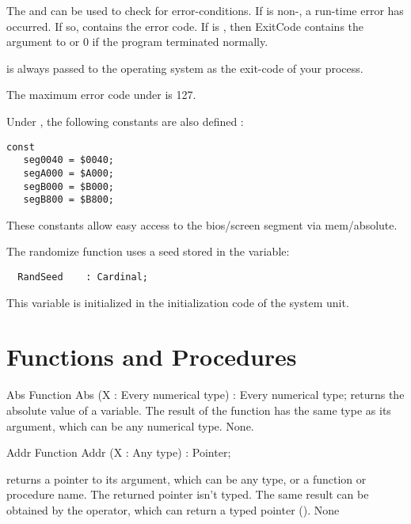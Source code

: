 \documentclass{report}
\begin{document}

The  and  can be used to check for
error-conditions. If  is non-, a run-time error has
occurred. If so,  contains the error code. If  is
, then {ExitCode} contains the argument to  or 0 if the
program terminated normally.

 is always passed to the operating system as the exit-code of
your process. 

\begin{remark}
The maximum error code under \linux is 127.
\end{remark}

Under , the following constants are also defined :
\begin{verbatim}
const
   seg0040 = $0040;
   segA000 = $A000;
   segB000 = $B000;
   segB800 = $B800;
\end{verbatim}
These constants allow easy access to the bios/screen segment via mem/absolute.

The randomize function uses a seed stored in the  variable:
\begin{verbatim}
  RandSeed    : Cardinal;
\end{verbatim}
This variable is initialized in the initialization code of the system unit.

\section{Functions and Procedures}

\begin{function}{Abs}
\Declaration
Function Abs (X : Every numerical type) : Every numerical type;
\Description
{} returns the absolute value of a variable. The result of the
function has the same type as its argument, which can be any numerical
type.
\Errors
None.
\SeeAlso
{}
\end{function}


\begin{function}{Addr}
\Declaration
Function Addr (X : Any type) : Pointer;

\Description
{} returns a pointer to its argument, which can be any type, or a
function or procedure name. The returned pointer isn't typed.
The same result can be obtained by the  operator, which can return a
typed pointer (\progref).
\Errors
None
\SeeAlso
{}
\end{function}
\end{document}
